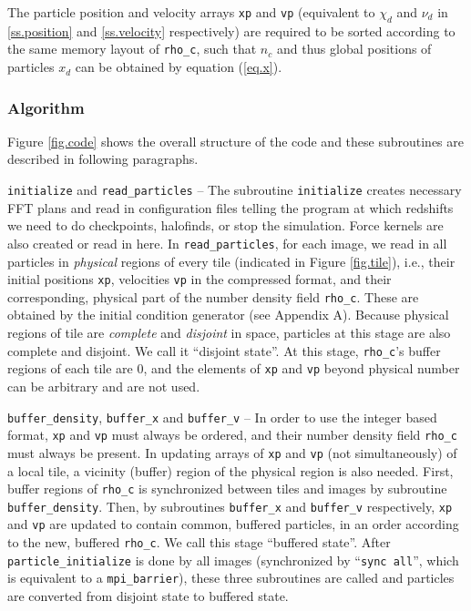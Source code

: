 \documentclass[10pt,twocolumn,preprint]{emulateapj}
\begin{document}
The particle position and velocity arrays {\tt xp} and {\tt vp} (equivalent to $\chi_d$ and $\nu_d$ in \ref{ss.position} and \ref{ss.velocity} respectively) are required to be sorted according to the same memory layout of {\tt rho\_c}, such that $n_c$ and thus global positions of particles $x_d$ can be obtained by equation (\ref{eq.x}).

\subsubsection{Algorithm}\label{sss.algorithm}
Figure \ref{fig.code} shows the overall structure of the code and these subroutines are described in following paragraphs. 

{\tt initialize} and {\tt read\_particles} -- The subroutine {\tt initialize} creates necessary FFT plans and read in configuration files telling the program at which redshifts we need to do checkpoints, halofinds, or stop the simulation. Force kernels are also created or read in here. In {\tt read\_particles}, for each image, we read in all particles in {\it physical} regions of every tile (indicated in Figure \ref{fig.tile}), i.e., their initial positions {\tt xp}, velocities {\tt vp} in the compressed format, and their corresponding, physical part of the number density field {\tt rho\_c}. These are obtained by the initial condition generator (see Appendix A). Because physical regions of tile are {\it complete} and {\it disjoint} in space, particles at this stage are also complete and disjoint. We call it ``disjoint state''. At this stage, {\tt rho\_c}'s buffer regions of each tile are 0, and the elements of {\tt xp} and {\tt vp} beyond physical number can be arbitrary and are not used.

{\tt buffer\_density}, {\tt buffer\_x} and {\tt buffer\_v} -- In order to use the integer based format, {\tt xp} and {\tt vp} must always be ordered, and their number density field {\tt rho\_c} must always be present. In updating arrays of {\tt xp} and {\tt vp} (not simultaneously) of a local tile, a vicinity (buffer) region of the physical region is also needed. First, buffer regions of {\tt rho\_c} is synchronized between tiles and images by subroutine {\tt buffer\_density}. Then, by subroutines {\tt buffer\_x} and {\tt buffer\_v} respectively, {\tt xp} and {\tt vp} are updated to contain common, buffered particles, in an order according to the new, buffered {\tt rho\_c}. We call this stage ``buffered state''. After {\tt particle\_initialize} is done by all images (synchronized by ``{\tt sync all}'', which is equivalent to a {\tt mpi\_barrier}), these three subroutines are called and particles are converted from disjoint state to buffered state.
\end{document}
